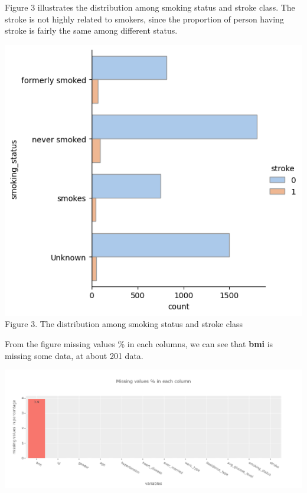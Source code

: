 \documentclass[a4paper]{report}
\begin{document}
	
	Figure 3 illustrates the distribution among smoking status and  stroke class. The stroke is not highly related to smokers, since the proportion of person having stroke is fairly the same among different status. 
	\begin{center}
		
		\includegraphics[scale=0.70]{smoke.png} \\
		\small Figure 3. The distribution among smoking status and stroke class
	\end{center} 
	\vspace{0.5cm}
	
	
	From the figure missing values \% in each columns, we can see that \textbf{bmi} is missing some data, at about 201 data. 
	\begin{center}
		\includegraphics[scale=0.45]{missing_value.png}
	\end{center}
	
\end{document}
